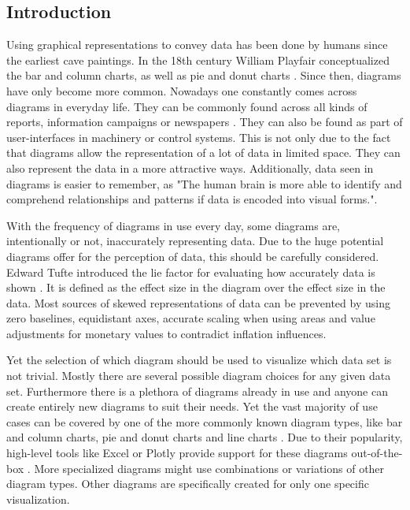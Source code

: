\subsection{Introduction}
Using graphical representations to convey data has been done by humans since the earliest cave paintings. In the 18th century William Playfair conceptualized the bar and column charts, as well as pie and donut charts \cite{dur2012analysis}. Since then, diagrams have only become more common. Nowadays one constantly comes across diagrams in everyday life. They can be commonly found across all kinds of reports, information campaigns or newspapers \cite{utt2000update}. They can also be found as part of user-interfaces in machinery or control systems. This is not only due to the fact that diagrams allow the representation of a lot of data in limited space. They can also represent the data in a more attractive ways. Additionally, data seen in diagrams is easier to remember, as "The human brain is more able to identify and comprehend relationships and patterns if data is encoded into visual forms."\cite{cleveland1985elements}.

With the frequency of diagrams in use every day, some diagrams are, intentionally or not, inaccurately representing data. Due to the huge potential diagrams offer for the perception of data, this should be carefully considered. Edward Tufte introduced the lie factor for evaluating how accurately data is shown \cite{tufte}. It is defined as the effect size in the diagram over the effect size in the data. Most sources of skewed representations of data can be prevented by using zero baselines, equidistant axes, accurate scaling when using areas and value adjustments for monetary values to contradict inflation influences.

Yet the selection of which diagram should be used to visualize which data set is not trivial. Mostly there are several possible diagram choices for any given data set. Furthermore there is a plethora of diagrams already in use and anyone can create entirely new diagrams to suit their needs. Yet the vast majority of use cases can be covered by one of the more commonly known diagram types, like bar and column charts, pie and donut charts and line charts \cite{lankow2012infographics}. Due to their popularity, high-level tools like Excel or Plotly \cite{plotly} provide support for these diagrams out-of-the-box \cite{office_chart_types}. More specialized diagrams might use combinations or variations of other diagram types. Other diagrams are specifically created for only one specific visualization.


